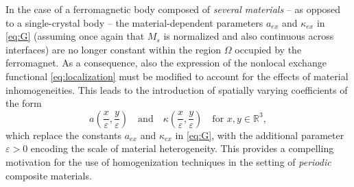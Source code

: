 \documentclass[reqno,11pt]{amsart}
\numberwithin{equation}{section}
\theoremstyle{thmlemcorr}
\numberwithin{theorem}{section}
\theoremstyle{thmlemcorr*}
\theoremstyle{defi}
\theoremstyle{remexample}
\theoremstyle{ass}
\newcommand{\R}{\mathbb{R}}
\newcommand{\dd}{\,\mathrm{d}}
\DeclarePairedDelimiter{\abs}{\lvert}{\rvert}
\newcommand{\1}{\mathds{1}}
\newcommand{\Om}{\Omega}
\newcommand{\veps}{\varepsilon}
\begin{document}
In the case of a ferromagnetic body composed of \textit{several materials} -- as opposed to a single-crystal body -- the material-dependent parameters $a_{ex}$ and $\kappa_{ex}$ in \eqref{eq:G} (assuming once again that $M_s$ is normalized and also continuous across interfaces) 
are no longer constant within the region $\Om$ occupied by the ferromagnet. As a consequence, also the expression of the nonlocal exchange functional \eqref{eq:localization} must be modified to account for the effects of material inhomogeneities. This leads to the introduction of spatially varying coefficients of the form
\begin{equation*}
    a\left(\frac{x}{\veps},\frac{y}{\veps}\right) \quad \text{and} \quad \kappa \left(\frac{x}{\veps},\frac{y}{\veps}\right) \quad \text{for } x, y \in \R^3,
\end{equation*} which replace the constants $a_{ex}$ and $\kappa_{ex}$ in \eqref{eq:G}, with the additional parameter 
$\veps > 0$ encoding the scale of material heterogeneity. This provides a compelling motivation for the use of homogenization techniques in the setting of \textit{periodic} composite materials. 


		
\end{document}
